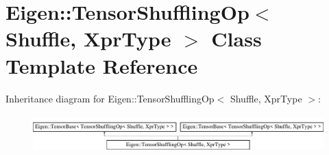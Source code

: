 \hypertarget{class_eigen_1_1_tensor_shuffling_op}{}\section{Eigen\+:\+:Tensor\+Shuffling\+Op$<$ Shuffle, Xpr\+Type $>$ Class Template Reference}
\label{class_eigen_1_1_tensor_shuffling_op}
Inheritance diagram for Eigen\+:\+:Tensor\+Shuffling\+Op$<$ Shuffle, Xpr\+Type $>$\+:\begin{figure}[H]
\begin{center}
\leavevmode
\includegraphics[height=1.485411cm]{class_eigen_1_1_tensor_shuffling_op}
\end{center}
\end{figure}
